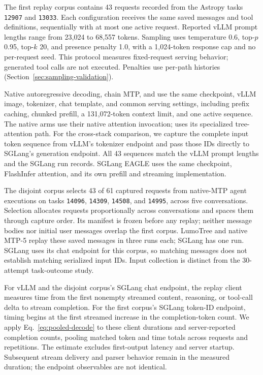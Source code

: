 The first replay corpus contains 43 requests recorded from the Astropy tasks \texttt{12907} and \texttt{13033}. Each configuration receives the same saved messages and tool definitions, sequentially with at most one active request. Reported vLLM prompt lengths range from 23,024 to 68,557 tokens. Sampling uses temperature 0.6, top-$p$ 0.95, top-$k$ 20, and presence penalty 1.0, with a 1,024-token response cap and no per-request seed. This protocol measures fixed-request serving behavior; generated tool calls are not executed. Penalties use per-path histories (Section~\ref{sec:sampling-validation}).

Native autoregressive decoding, chain MTP, and \sys{} use the same checkpoint, vLLM image, tokenizer, chat template, and common serving settings, including prefix caching, chunked prefill, a 131,072-token context limit, and one active sequence. The native arms use their native attention invocation; \sys{} uses its specialized tree-attention path. For the cross-stack comparison, we capture the complete input token sequence from vLLM's tokenizer endpoint and pass those IDs directly to SGLang's generation endpoint. All 43 sequences match the vLLM prompt lengths and the SGLang run records. SGLang EAGLE uses the same checkpoint, FlashInfer attention, and its own prefill and streaming implementation.

The disjoint corpus selects 43 of 61 captured requests from native-MTP agent executions on tasks \texttt{14096}, \texttt{14309}, \texttt{14508}, and \texttt{14995}, across five conversations. Selection allocates requests proportionally across conversations and spaces them through capture order. Its manifest is frozen before any replay; neither message bodies nor initial user messages overlap the first corpus. LumoTree and native MTP-5 replay these saved messages in three runs each; SGLang has one run. SGLang uses its chat endpoint for this corpus, so matching messages does not establish matching serialized input IDs. Input collection is distinct from the 30-attempt task-outcome study.

For vLLM and the disjoint corpus's SGLang chat endpoint, the replay client measures time from the first nonempty streamed content, reasoning, or tool-call delta to stream completion. For the first corpus's SGLang token-ID endpoint, timing begins at the first streamed increase in the completion-token count. We apply Eq.~\ref{eq:pooled-decode} to these client durations and server-reported completion counts, pooling matched token and time totals across requests and repetitions. The estimate excludes first-output latency and server startup. Subsequent stream delivery and parser behavior remain in the measured duration; the endpoint observables are not identical.
